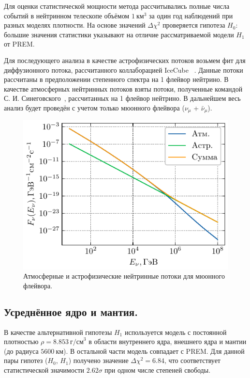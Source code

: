 Для оценки статистической мощности метода рассчитывались полные числа событий в нейтринном телескопе объёмом $1~\text{км}^3$ за один год наблюдений при разных моделях плотности. На основе значений $\Delta\chi^2$ проверяется гипотеза $H_0$: большие значения статистики указывают на отличие рассматриваемой модели $H_1$ от PREM.

Для последующего анализа в качестве астрофизических потоков возьмем фит для диффузионного потока, рассчитанного коллаборацией IceCube ~\cite{Abbasi_2024}. Данные потоки рассчитаны в предположении степенного спектра на 1 флейвор нейтрино. В качестве атмосферных нейтринных потоков взяты потоки, полученные командой С. И. Синеговского~\cite{sinegovskaya2015}, рассчитанных на 1 флейвор нейтрино. В дальнейшем весь анализ будет проведён с учетом только мюонного флейвора ($\nu_{\mu}$ + $\bar{\nu}_{\mu}$).
  \begin{figure}[!h]
    \centering
    \includegraphics[width=0.8\linewidth]{images/NuProp/fluxes.pdf}
    \caption{Атмосферные и астрофизические нейтринные потоки для мюонного флейвора.}
    \label{NuFluxes_astro_and_atmo}
  \end{figure}
\subsection*{Усреднённое ядро и мантия.}  
В качестве альтернативной гипотезы $H_1$ используется модель с постоянной плотностью $\rho = 8.853~\text{г/см}^3$ в области внутреннего ядра, внешнего ядра и мантии (до радиуса $5600~\text{км}$).  
В остальной части модель совпадает с PREM.  
Для данной пары гипотез ($H_0$, $H_1$) получено значение $\Delta\chi^2 = 6.84$, что соответствует статистической значимости $2.62\sigma$ при одном числе степеней свободы.
  
